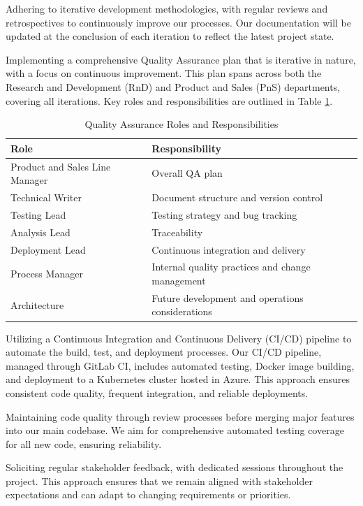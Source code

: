 Adhering to iterative development methodologies, with regular reviews and retrospectives to continuously improve our processes. Our documentation will be updated at the conclusion of each iteration to reflect the latest project state.

Implementing a comprehensive Quality Assurance plan that is iterative in nature, with a focus on continuous improvement. This plan spans across both the Research and Development (RnD) and Product and Sales (PnS) departments, covering all iterations. Key roles and responsibilities are outlined in Table \ref{tab:qa-responsibilities}.

\begin{table}[h]
\centering
\caption{Quality Assurance Roles and Responsibilities}
\label{tab:qa-responsibilities}
\begin{tabular}{|l|l|}
\hline
\textbf{Role} & \textbf{Responsibility} \\
\hline
Product and Sales Line Manager & Overall QA plan \\
Technical Writer & Document structure and version control \\
Testing Lead & Testing strategy and bug tracking \\
Analysis Lead & Traceability \\
Deployment Lead & Continuous integration and delivery \\
Process Manager & Internal quality practices and change management \\
Architecture & Future development and operations considerations \\
\hline
\end{tabular}
\end{table}

Utilizing a Continuous Integration and Continuous Delivery (CI/CD) pipeline to automate the build, test, and deployment processes. Our CI/CD pipeline, managed through GitLab CI, includes automated testing, Docker image building, and deployment to a Kubernetes cluster hosted in Azure. This approach ensures consistent code quality, frequent integration, and reliable deployments.

Maintaining code quality through review processes before merging major features into our main codebase. We aim for comprehensive automated testing coverage for all new code, ensuring reliability.

Soliciting regular stakeholder feedback, with dedicated sessions throughout the project. This approach ensures that we remain aligned with stakeholder expectations and can adapt to changing requirements or priorities.

